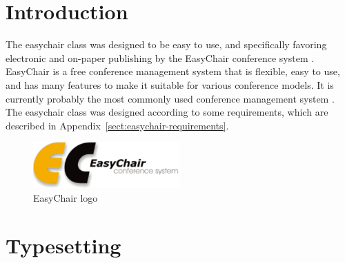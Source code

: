 \documentclass[]{easychair}
\newcommand{\easychair}{\textsf{easychair}}
\begin{document}
\maketitle
%
\begin{abstract}
In order to ease the lives of authors, editors, and trees, we present an
easy-to-read guide to the easy-to-use {\easychair} {\LaTeX2e} document style
class for EasyChair-based electronic and on-paper publishing of workshop and conference
proceedings.
\end{abstract}

\section{Introduction}
\label{sect:introduction}

The {\easychair} class was designed to be easy to use, and specifically 
favoring electronic and on-paper publishing by the EasyChair conference system
\cite{easychair}.
EasyChair is a free conference management system that is flexible, easy to use,
and has many features to make it suitable for various conference models.
It is currently probably the most commonly used conference management 
system \cite{easychair}.
The {\easychair} class was designed according to some requirements, which
are described in Appendix~\ref{sect:easychair-requirements}.

\begin{figure}[htb!]
	\begin{centering}
	\includegraphics[width=0.5\textwidth]{logoEC}
	\caption{EasyChair logo}
	\label{fig:easychair-logo}
	\end{centering}
\end{figure}

\section{Typesetting}
\label{sect:typesetting}
\end{document}
